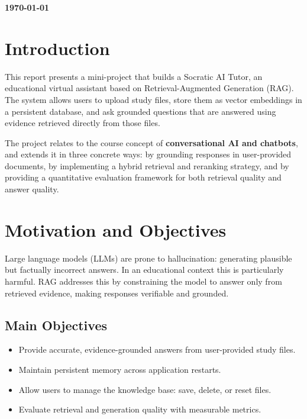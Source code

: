 \documentclass[12pt,a4paper]{article}
\begin{document}
\begin{titlepage}
  \vfill
  {\large\textbf{\today}}
\end{titlepage}

\tableofcontents
\newpage

\section{Introduction}

This report presents a mini-project that builds a Socratic AI Tutor, an educational
virtual assistant based on Retrieval-Augmented Generation (RAG). The system allows
users to upload study files, store them as vector embeddings in a persistent database,
and ask grounded questions that are answered using evidence retrieved directly from
those files.

The project relates to the course concept of \textbf{conversational AI and chatbots},
and extends it in three concrete ways: by grounding responses in user-provided
documents, by implementing a hybrid retrieval and reranking strategy, and by providing
a quantitative evaluation framework for both retrieval quality and answer quality.

\section{Motivation and Objectives}

Large language models (LLMs) are prone to hallucination: generating plausible but
factually incorrect answers. In an educational context this is particularly harmful.
RAG addresses this by constraining the model to answer only from retrieved evidence,
making responses verifiable and grounded.

\subsection*{Main Objectives}
\begin{itemize}[leftmargin=*]
  \item Provide accurate, evidence-grounded answers from user-provided study files.
  \item Maintain persistent memory across application restarts.
  \item Allow users to manage the knowledge base: save, delete, or reset files.
  \item Evaluate retrieval and generation quality with measurable metrics.
\end{itemize}
\end{document}
